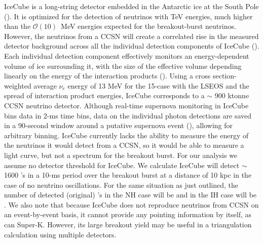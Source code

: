 IceCube is a long-string detector embedded in the Antarctic ice at the
South Pole (\citealp{achterbergetal2006,abbasi2010}). It
is optimized for the detection of neutrinos with TeV energies, much
higher than the $\mathcal{O}(10)$~MeV energies expected for the
breakout-burst neutrinos. 
However, the
neutrinos from a CCSN will create a correlated rise in the measured
detector background across all the individual detection components of IceCube
(\citealp{pryoretal1988,halzenetal1996}).  
Each individual detection component effectively monitors 
an energy-dependent volume of ice surrounding it, with the 
size of the effective volume depending linearly on the 
energy of the interaction products (\citealt{abbasietal2011}).  
Using a cross section-weighted average $\nu_e$ energy of 13 MeV 
for the 15-\Msol case with the LSEOS and the spread of interaction 
product energies, IceCube corresponds to a $\sim$ 900 ktonne 
CCSN neutrino detector.
Although real-time supernova monitoring in IceCube bins data 
in 2-ms time bins, data on the individual photon detections 
are saved in a 90-second window around a putative supernova 
event (\citealt{aartsenetal2013}), allowing for arbitrary binning.
IceCube
currently lacks the ability to measure the energy of the neutrinos it
would detect from a CCSN, so it would be able to measure a light curve, but
not a spectrum for the breakout burst.  For our analysis we assume no
detector threshold for IceCube.  We calculate 
IceCube  will detect 
$\sim$1600 \nue's in a 10-ms period over the
breakout burst at a distance of 10 kpc in the case of no neutrino
oscillations.  For the same situation as just outlined, the number of
detected (original) \nue's in the NH case will be  and in the IH
case will be .  We also note that because
IceCube does not reproduce neutrinos from CCSN on an event-by-event
basis, it cannot provide any pointing information by itself, as can
Super-K.  However, its large breakout yield may be useful
in a triangulation calculation using multiple detectors.

